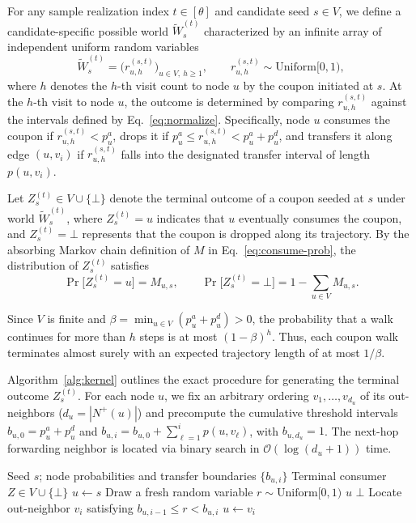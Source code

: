 \documentclass[sigconf]{acmart}
\begin{document}
For any sample realization index $t\in[\theta]$ and candidate seed $s\in V$,
we define a candidate-specific possible world $\widetilde{W}_s^{(t)}$
characterized by an infinite array of independent uniform random variables
\[
  \widetilde{W}_s^{(t)} = \bigl(r_{u,h}^{(s,t)}\bigr)_{u\in V,\ h\ge 1},
  \qquad r_{u,h}^{(s,t)} \sim \mathrm{Uniform}[0,1),
\]
where $h$ denotes the $h$-th visit count to node $u$ by the coupon initiated at
$s$.
At the $h$-th visit to node $u$, the outcome is determined by comparing
$r_{u,h}^{(s,t)}$ against the intervals defined by Eq.~\eqref{eq:normalize}.
Specifically, node $u$ consumes the coupon if $r_{u,h}^{(s,t)} < p_u^a$, drops
it if $p_u^a \le r_{u,h}^{(s,t)} < p_u^a + p_u^d$, and transfers it along edge
$(u, v_i)$ if $r_{u,h}^{(s,t)}$ falls into the designated transfer interval of
length $p(u, v_i)$.

Let $Z_s^{(t)} \in V \cup \{\bot\}$ denote the terminal outcome of a coupon
seeded at $s$ under world $\widetilde{W}_s^{(t)}$, where $Z_s^{(t)} = u$ indicates
that $u$ eventually consumes the coupon, and $Z_s^{(t)} = \bot$ represents that
the coupon is dropped along its trajectory.
By the absorbing Markov chain definition of $M$ in Eq.~\eqref{eq:consume-prob},
the distribution of $Z_s^{(t)}$ satisfies
\begin{equation}
\label{eq:endpoint-law}
  \Pr\bigl[Z_s^{(t)} = u\bigr] = M_{u,s},
  \qquad
  \Pr\bigl[Z_s^{(t)} = \bot\bigr] = 1 - \sum_{u\in V} M_{u,s}.
\end{equation}

Since $V$ is finite and $\beta = \min_{u\in V}(p_u^a + p_u^d) > 0$, the
probability that a walk continues for more than $h$ steps is at most
$(1-\beta)^h$.
Thus, each coupon walk terminates almost surely with an expected trajectory
length of at most $1/\beta$.

Algorithm~\ref{alg:kernel} outlines the exact procedure for generating the
terminal outcome $Z_s^{(t)}$.
For each node $u$, we fix an arbitrary ordering $v_1,\ldots,v_{d_u}$ of its
out-neighbors ($d_u = |N^+(u)|$) and precompute the cumulative threshold intervals
$b_{u,0} = p_u^a + p_u^d$ and $b_{u,i} = b_{u,0} + \sum_{\ell=1}^i p(u, v_\ell)$,
with $b_{u,d_u} = 1$.
The next-hop forwarding neighbor is located via binary search in
$\mathcal{O}(\log(d_u + 1))$ time.

\begin{algorithm}[t]
\caption{Sample Terminal Consumer of One Coupon}
\label{alg:kernel}
\begin{algorithmic}[1]
\Require Seed $s$; node probabilities and transfer boundaries $\{b_{u,i}\}$
\Ensure Terminal consumer $Z \in V \cup \{\bot\}$
\State $u \gets s$
  \State Draw a fresh random variable $r \sim \mathrm{Uniform}[0,1)$
    \State \Return $u$ 
    \State \Return $\bot$ 
  \Else
    \State Locate out-neighbor $v_i$ satisfying $b_{u,i-1} \le r < b_{u,i}$
    \State $u \gets v_i$ 
  \EndIf
\EndWhile
\end{algorithmic}
\end{algorithm}
\end{document}
